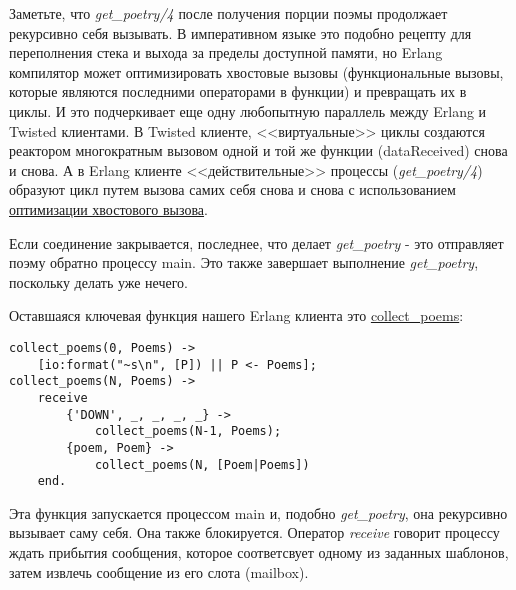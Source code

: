 Заметьте, что \textit{get\_poetry/4} после получения порции поэмы 
продолжает рекурсивно себя вызывать. В императивном языке это подобно 
рецепту для переполнения стека и выхода за пределы доступной памяти, но 
Erlang компилятор может оптимизировать хвостовые вызовы (функциональные 
вызовы, которые являются последними операторами в функции) и превращать их 
в циклы. И это подчеркивает еще одну любопытную параллель между Erlang и 
Twisted клиентами. В Twisted клиенте, <<виртуальные>> циклы создаются 
реактором многократным вызовом одной и той же функции (dataReceived) снова и снова. 
А в Erlang клиенте <<действительные>> процессы (\textit{get\_poetry/4}) 
образуют цикл путем вызова самих себя снова и снова с использованием 
\href{http://stackoverflow.com/questions/310974/what-is-tail-call-optimization}{оптимизации хвостового вызова}.



Если соединение закрывается, последнее, что делает \textit{get\_poetry} - 
это отправляет поэму обратно процессу main. Это также завершает выполнение 
\textit{get\_poetry}, поскольку делать уже нечего.


Оставшаяся ключевая функция нашего Erlang клиента это 
\href{http://github.com/jdavisp3/twisted-intro/blob/master/erlang-client-1/get-poetry#L58}{collect\_poems}:

 \begin{verbatim}
collect_poems(0, Poems) ->
    [io:format("~s\n", [P]) || P <- Poems];
collect_poems(N, Poems) ->
    receive
        {'DOWN', _, _, _, _} ->
            collect_poems(N-1, Poems);
        {poem, Poem} ->
            collect_poems(N, [Poem|Poems])
    end.
\end{verbatim} 


Эта функция запускается процессом main и, подобно \textit{get\_poetry}, 
она рекурсивно вызывает саму себя. Она также блокируется. Оператор \textit{receive} 
говорит процессу ждать прибытия сообщения, которое соответсвует 
одному из заданных шаблонов, затем извлечь сообщение из его слота (mailbox).


